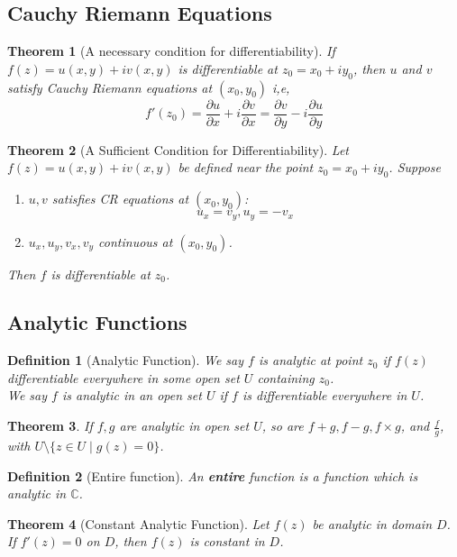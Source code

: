 \documentclass[12pt]{article}
\newtheorem{definition}{Definition}[section]
\newtheorem{theorem}{Theorem}[section]
\theoremstyle{definition}
\begin{document}
\subsection{Cauchy Riemann Equations}
\begin{theorem}[A necessary condition for differentiability]
\normalfont If $f(z)=u(x,y)+iv(x,y)$ is differentiable at $z_0 = x_0 + iy_0$, then $u$ and $v$ satisfy Cauchy Riemann equations at $(x_0, y_0)$ i,e,
\[
f'(z_0)=\frac{\partial u}{\partial x} + i\frac{\partial v}{\partial x}=\frac{\partial v}{\partial y}-i\frac{\partial u}{\partial y}
\]
\end{theorem}
\begin{theorem}[A Sufficient Condition for Differentiability]
\normalfont Let $f(z)=u(x,y)+iv(x,y)$ be defined near the point $z_0 = x_0 + iy_0$. Suppose
\begin{enumerate}
	\item $u, v$ satisfies CR equations at $(x_0,y_0)$:\[
u_x=v_y, u_y=-v_x
	\]
	\item $u_x,u_y,v_x,v_y$ continuous at $(x_0, y_0)$.
\end{enumerate}
Then $f$ is differentiable at $z_0$.
\end{theorem}
\subsection{Analytic Functions}
\begin{definition}[Analytic Function]
\normalfont We say $f$ is analytic at point $z_0$ if $f(z)$ differentiable everywhere in some open set $U$ containing $z_0$.\\
We say $f$ is analytic in an open set $U$ if $f$ is differentiable everywhere in $U$.
\end{definition}
\begin{theorem}\normalfont If $f,g$ are analytic in open set $U$, so are $f+g, f-g, f\times g$, and $\frac{f}{g}$, with $U\setminus \{z\in U\mid g(z)=0\}$.\end{theorem}
\begin{definition}[Entire function]
\normalfont An \textbf{entire} function is a function which is analytic in $\mathbb{C}$.
\end{definition}
\begin{theorem}[Constant Analytic Function]
\normalfont Let $f(z)$ be analytic in domain $D$. If $f'(z)=0$ on $D$, then $f(z)$ is constant in $D$.
\end{theorem}
\end{document}
